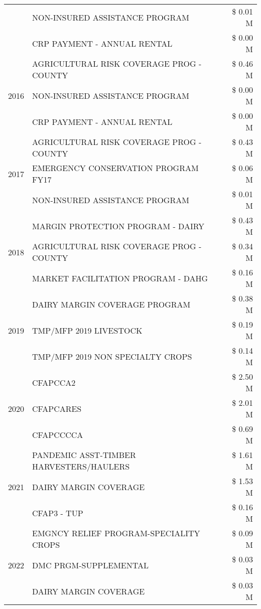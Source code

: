 \begin{tabular}{llr}
 & NON-INSURED ASSISTANCE PROGRAM & \$ 0.01 M \\
 & CRP PAYMENT - ANNUAL RENTAL & \$ 0.00 M \\
\cline{1-3}
\multirow[t]{3}{*}{2016} & AGRICULTURAL RISK COVERAGE PROG - COUNTY & \$ 0.46 M \\
 & NON-INSURED ASSISTANCE PROGRAM & \$ 0.00 M \\
 & CRP PAYMENT - ANNUAL RENTAL & \$ 0.00 M \\
\cline{1-3}
\multirow[t]{3}{*}{2017} & AGRICULTURAL RISK COVERAGE PROG - COUNTY & \$ 0.43 M \\
 & EMERGENCY CONSERVATION PROGRAM FY17 & \$ 0.06 M \\
 & NON-INSURED ASSISTANCE PROGRAM & \$ 0.01 M \\
\cline{1-3}
\multirow[t]{3}{*}{2018} & MARGIN PROTECTION PROGRAM - DAIRY & \$ 0.43 M \\
 & AGRICULTURAL RISK COVERAGE PROG - COUNTY & \$ 0.34 M \\
 & MARKET FACILITATION PROGRAM - DAHG & \$ 0.16 M \\
\cline{1-3}
\multirow[t]{3}{*}{2019} & DAIRY MARGIN COVERAGE PROGRAM & \$ 0.38 M \\
 & TMP/MFP 2019 LIVESTOCK & \$ 0.19 M \\
 & TMP/MFP 2019 NON SPECIALTY CROPS & \$ 0.14 M \\
\cline{1-3}
\multirow[t]{3}{*}{2020} & CFAPCCA2 & \$ 2.50 M \\
 & CFAPCARES & \$ 2.01 M \\
 & CFAPCCCCA & \$ 0.69 M \\
\cline{1-3}
\multirow[t]{3}{*}{2021} & PANDEMIC ASST-TIMBER HARVESTERS/HAULERS & \$ 1.61 M \\
 & DAIRY MARGIN COVERAGE & \$ 1.53 M \\
 & CFAP3 - TUP & \$ 0.16 M \\
\cline{1-3}
\multirow[t]{3}{*}{2022} & EMGNCY RELIEF PROGRAM-SPECIALITY CROPS & \$ 0.09 M \\
 & DMC PRGM-SUPPLEMENTAL & \$ 0.03 M \\
 & DAIRY MARGIN COVERAGE & \$ 0.03 M \\
\cline{1-3}
\bottomrule
\end{tabular}
